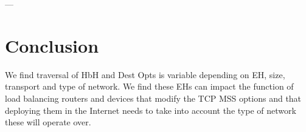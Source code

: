 \documentclass[conference]{IEEEtran}
\begin{document}

---






\section{Conclusion}
\label{sec:conclusion}

We  find traversal of HbH and Dest Opts is variable depending on EH, size, transport and type of network. We find these EHs can impact the function of load balancing routers and devices that modify the TCP MSS options and that deploying them in the Internet needs to take into account the type of network these will operate over.



\small

\end{document}
